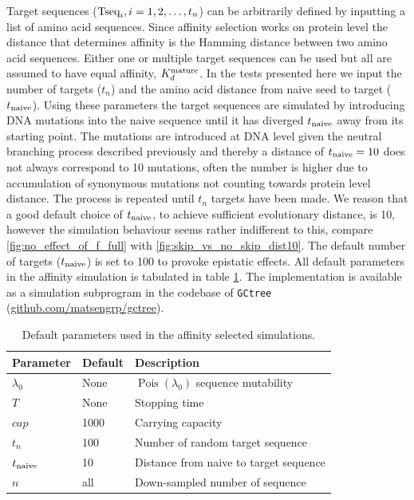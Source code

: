 Target sequences ($\text{Tseq}_i, i=1,2, \hdots, t_n$) can be arbitrarily defined by inputting a list of amino acid sequences.
Since affinity selection works on protein level the distance that determines affinity is the Hamming distance between two amino acid sequences.
Either one or multiple target sequences can be used but all are assumed to have equal affinity, $K^{\text{mature}}_d$.
In the tests presented here we input the number of targets ($t_n$) and the amino acid distance from naive seed to target ($t_{\text{naive}}$).
Using these parameters the target sequences are simulated by introducing DNA mutations into the naive sequence until it has diverged $t_{\text{naive}}$ away from its starting point.
The mutations are introduced at DNA level given the neutral branching process described previously and thereby a distance of $t_{\text{naive}}=10$ does not always correspond to 10 mutations, often the number is higher due to accumulation of synonymous mutations not counting towards protein level distance.
The process is repeated until $t_n$ targets have been made.
We reason that a good default choice of $t_{\text{naive}}$, to achieve sufficient evolutionary distance, is 10, however the simulation behaviour seems rather indifferent to this, compare \ref{fig:no_effect_of_f_full} with \ref{fig:skip_vs_no_skip_dist10}.
The default number of targets ($t_{\text{naive}}$) is set to 100 to provoke epistatic effects.
All default parameters in the affinity simulation is tabulated in table \ref{aff_constants}.
The implementation is available as a simulation subprogram in the codebase of \texttt{GCtree} (\url{github.com/matsengrp/gctree}).

\begin{table}[ht]
\centering
\begin{tabular}{lll}
Parameter    & Default & Description \\ \hline
$\lambda_0$ & None & $\operatorname{Pois}(\lambda_0)$ sequence mutability \\
$T$ & None & Stopping time \\
$cap$ & 1000 & Carrying capacity \\
$t_n$ & 100 & Number of random target sequence \\
$t_{\text{naive}}$ & 10 & Distance from naive to target sequence \\
$n$ & all & Down-sampled number of sequence
\end{tabular}
\caption{
\label{aff_constants}
    Default parameters used in the affinity selected simulations.}
\end{table}










